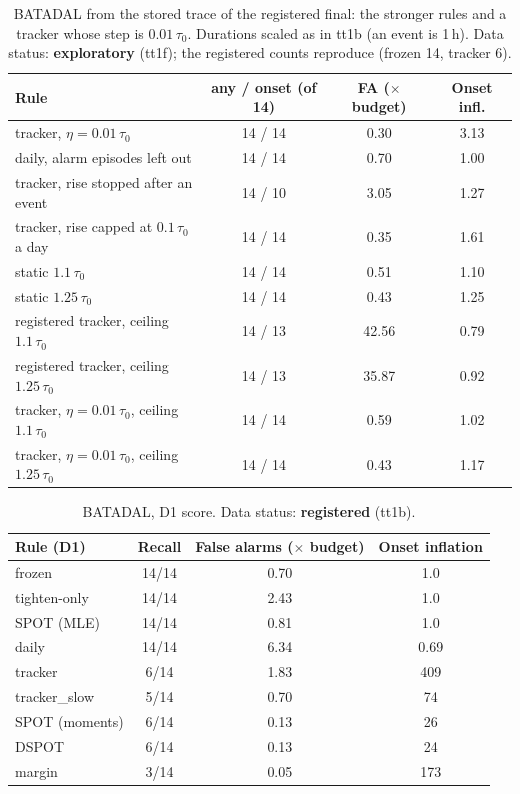 \documentclass[letterpaper,twocolumn,10pt]{article}
\begin{document}
\begin{table}[t]
\caption{BATADAL from the stored trace of the registered final: the stronger rules and a tracker whose
step is $0.01\,\tau_0$. Durations scaled as in tt1b (an event is 1\,h). Data status: \textbf{exploratory}
(tt1f); the registered counts reproduce (frozen 14, tracker 6).}
\label{tab:batadalstrong}
\small
\begin{tabularx}{\columnwidth}{@{}Lccc@{}}
\toprule
Rule & any / onset (of 14) & FA ($\times$ budget) & Onset infl. \\
\midrule
tracker, $\eta = 0.01\,\tau_0$ & 14 / 14 & 0.30 & 3.13 \\
daily, alarm episodes left out & 14 / 14 & 0.70 & 1.00 \\
tracker, rise stopped after an event & 14 / 10 & 3.05 & 1.27 \\
tracker, rise capped at $0.1\,\tau_0$ a day & 14 / 14 & 0.35 & 1.61 \\
static $1.1\,\tau_0$ & 14 / 14 & 0.51 & 1.10 \\
static $1.25\,\tau_0$ & 14 / 14 & 0.43 & 1.25 \\
registered tracker, ceiling $1.1\,\tau_0$ & 14 / 13 & 42.56 & 0.79 \\
registered tracker, ceiling $1.25\,\tau_0$ & 14 / 13 & 35.87 & 0.92 \\
tracker, $\eta = 0.01\,\tau_0$, ceiling $1.1\,\tau_0$ & 14 / 14 & 0.59 & 1.02 \\
tracker, $\eta = 0.01\,\tau_0$, ceiling $1.25\,\tau_0$ & 14 / 14 & 0.43 & 1.17 \\
\bottomrule
\end{tabularx}
\end{table}

\begin{table}[t]
\caption{BATADAL, D1 score. Data status: \textbf{registered} (tt1b).}
\label{tab:batadal}
\begin{tabularx}{\columnwidth}{@{}lCCC@{}}
\toprule
Rule (D1) & Recall & False alarms ($\times$ budget) & Onset inflation \\
\midrule
frozen & 14/14 & 0.70 & 1.0 \\
tighten-only & 14/14 & 2.43 & 1.0 \\
SPOT (MLE) & 14/14 & 0.81 & 1.0 \\
daily & 14/14 & 6.34 & 0.69 \\
tracker & 6/14 & 1.83 & 409 \\
tracker\_slow & 5/14 & 0.70 & 74 \\
SPOT (moments) & 6/14 & 0.13 & 26 \\
DSPOT & 6/14 & 0.13 & 24 \\
margin & 3/14 & 0.05 & 173 \\
\bottomrule
\end{tabularx}
\end{table}
\end{document}
